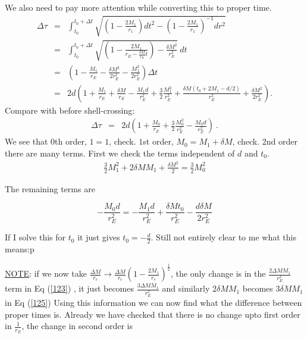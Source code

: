 \documentclass[12pt,letterpaper]{JHEP3}
\begin{document}
We also need to pay more attention while converting this to proper time.
\begin{eqnarray}
\Delta \tau &=& \int_{t_0}^{t_0+\Delta t}
 \sqrt{\left(1-\frac{2M_{1}}{r_1}\right)dt^2 - \left(1-\frac{2M_{1}}{r_1}\right)^{-1}dr^2} \nonumber	
 \\ 
&=& \int_{t_0}^{t_0+\Delta t} 
\sqrt{\left(1 - \frac{2M_{1}}{r_E - \frac{\delta M}{r_E}t}\right) - \frac{\delta M^2}{r_E^2} }
~dt \\ \nonumber
&=& \left(1 - \frac{M_{1}}{r_E} - \frac{\delta M^2}{2r_E^2} - \frac{M_{1}^2}{2 r_E^2} \right)
\Delta t \\
&=& 2d \left( 1 + \frac{M_1}{r_E} + \frac{\delta M}{r_E} -\frac{M_1d}{r_E^2}+ \frac{3}{2} \frac{M_1^2}{r_E^2}+ \frac{\delta M (t_0+2M_1-d/2)}{r_E^2} + \frac{\delta M^2}{2r_E^2} \right). \label{123}
\end{eqnarray}
Compare with before shell-crossing:
\begin{eqnarray}
\Delta \tau &=& 2d
\left(1 + \frac{M_{0}}{r_E} + \frac{3}{2}\frac{M_{0}^2}{r_E^2} - \frac{M_{0}d}{r_E^2}\right)~.
\end{eqnarray}
We see that $0$th order, $1=1$, check. $1$st order, $M_0 = M_1+\delta M$, check. $2$nd order there are many terms. First we check the terms independent of $d$ and $t_0$.
\begin{eqnarray}
\frac{3}{2} M_1^2+2\delta M M_1 + \frac{\delta M^2}{2} = \frac{3}{2} M_0^2	\label{125}
\end{eqnarray}

The remaining terms are

\begin{equation}
	-\frac{M_0 d}{r_E^2} = - \frac{M_1 d}{r_E^2} + \frac{\delta M t_0}{r_E^2} - \frac{d \delta M}{2r_E^2}
\end{equation}

\begin{tcolorbox}
If I solve this for $t_0$ it just gives $t_0 = - \frac{d}{2}$. Still not entirely clear to me what this means:p
\end{tcolorbox}

\underline{NOTE}: if we now take $\frac{\Delta M}{r_e} \rightarrow \frac{\Delta M}{r_e} \left( 1 - \frac{2M_1}{r_e} \right)^\frac{1}{2}$, the only change is in the $\frac{2 \Delta M M_1}{r^2_E}$ term in Eq (\ref{123}) , it just becomes  $\frac{3 \Delta M M_1}{r^2_E}$ and similarly $2 \delta M M_1$ becomes $3 \delta M M_1$ in Eq (\ref{125}) Using this information we can now find what the difference between proper times is. Already we have checked that there is no change upto first order in $\frac{1}{r_E}$, the change in second order is
\end{document}
